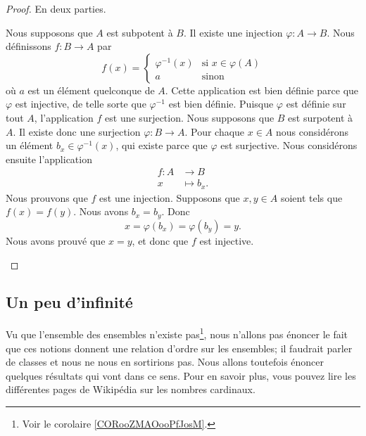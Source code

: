 \begin{proof}
	En deux parties.
	\begin{subproof}
		\spitem[\( \Rightarrow\)]
		Nous supposons que \( A\) est subpotent à \( B\). Il existe une injection \( \varphi\colon A\to B\). Nous définissons \( f\colon B\to A\) par
		\begin{equation}
			f(x)=\begin{cases}
				\varphi^{-1}(x) & \text{si } x\in\varphi(A) \\
				a               & \text{sinon }
			\end{cases}
		\end{equation}
		où \( a\) est un élément quelconque de \( A\). Cette application est bien définie parce que \( \varphi\) est injective, de telle sorte que \( \varphi^{-1}\) est bien définie. Puisque \( \varphi\) est définie sur tout \( A\), l'application \( f\) est une surjection.
		\spitem[\( \Leftarrow\)]
		Nous supposons que \( B\) est surpotent à \( A\). Il existe donc une surjection \( \varphi\colon B\to A\). Pour chaque \( x\in A\) nous considérons un élément \( b_x\in \varphi^{-1}(x)\), qui existe parce que \( \varphi\) est surjective. Nous considérons ensuite l'application
		\begin{equation}
			\begin{aligned}
				f\colon A & \to B        \\
				x         & \mapsto b_x.
			\end{aligned}
		\end{equation}
		Nous prouvons que \( f\) est une injection. Supposons que \( x,y\in A\) soient tels que \( f(x)=f(y)\). Nous avons \( b_x=b_y\). Donc
		\begin{equation}
			x=\varphi(b_x)=\varphi(b_y)=y.
		\end{equation}
		Nous avons prouvé que \( x=y\), et donc que \( f\) est injective.
	\end{subproof}
\end{proof}

\subsection{Un peu d'infinité}
\label{SUBooCardinalInfini}

\begin{normaltext}\label{NORooPasDeClasses}
	Vu que l'ensemble des ensembles n'existe pas\footnote{Voir le corolaire \ref{CORooZMAOooPfJosM}.}, nous n'allons pas énoncer le fait que ces notions donnent une relation d'ordre sur les ensembles; il faudrait parler de classes et nous ne nous en sortirions pas. Nous allons toutefois énoncer quelques résultats qui vont dans ce sens. Pour en savoir plus, vous pouvez lire les différentes pages de Wikipédia sur les nombres cardinaux.
\end{normaltext}

